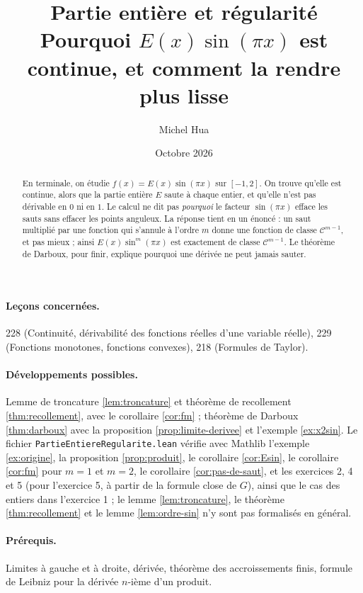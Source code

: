 \documentclass[11pt,a4paper]{article}
\title{Partie entière et régularité\\[2pt]
\large Pourquoi $E(x)\sin(\pi x)$ est continue, et comment la rendre plus lisse}
\author{Michel Hua}
\date{Octobre 2026}
\theoremstyle{plain}
\theoremstyle{definition}
\theoremstyle{remark}
\newcommand{\Cc}{\mathcal{C}}
\newcommand{\1}{\mathbf{1}}
\begin{document}
\maketitle

\begin{abstract}
En terminale, on étudie $f(x)=E(x)\sin(\pi x)$ sur $[-1,2]$. On trouve qu'elle est continue, alors que la partie entière $E$ saute à chaque entier, et qu'elle n'est pas dérivable en $0$ ni en $1$. Le calcul ne dit pas \emph{pourquoi} le facteur $\sin(\pi x)$ efface les sauts sans effacer les points anguleux. La réponse tient en un énoncé : un saut multiplié par une fonction qui s'annule à l'ordre $m$ donne une fonction de classe $\Cc^{m-1}$, et pas mieux ; ainsi $E(x)\sin^m(\pi x)$ est exactement de classe $\Cc^{m-1}$. Le théorème de Darboux, pour finir, explique pourquoi une dérivée ne peut jamais sauter.
\end{abstract}

\paragraph{Leçons concernées.} 228 (Continuité, dérivabilité des fonctions réelles d'une variable réelle), 229 (Fonctions monotones, fonctions convexes), 218 (Formules de Taylor).

\paragraph{Développements possibles.} Lemme de troncature \ref{lem:troncature} et théorème de recollement \ref{thm:recollement}, avec le corollaire \ref{cor:fm} ; théorème de Darboux \ref{thm:darboux} avec la proposition \ref{prop:limite-derivee} et l'exemple \ref{ex:x2sin}. Le fichier \texttt{PartieEntiereRegularite.lean} vérifie avec Mathlib l'exemple \ref{ex:origine}, la proposition \ref{prop:produit}, le corollaire \ref{cor:Esin}, le corollaire \ref{cor:fm} pour $m=1$ et $m=2$, le corollaire \ref{cor:pas-de-saut}, et les exercices 2, 4 et 5 (pour l'exercice 5, à partir de la formule close de $G$), ainsi que le cas des entiers dans l'exercice 1 ; le lemme \ref{lem:troncature}, le théorème \ref{thm:recollement} et le lemme \ref{lem:ordre-sin} n'y sont pas formalisés en général.

\paragraph{Prérequis.} Limites à gauche et à droite, dérivée, théorème des accroissements finis, formule de Leibniz pour la dérivée $n$-ième d'un produit.
\end{document}
